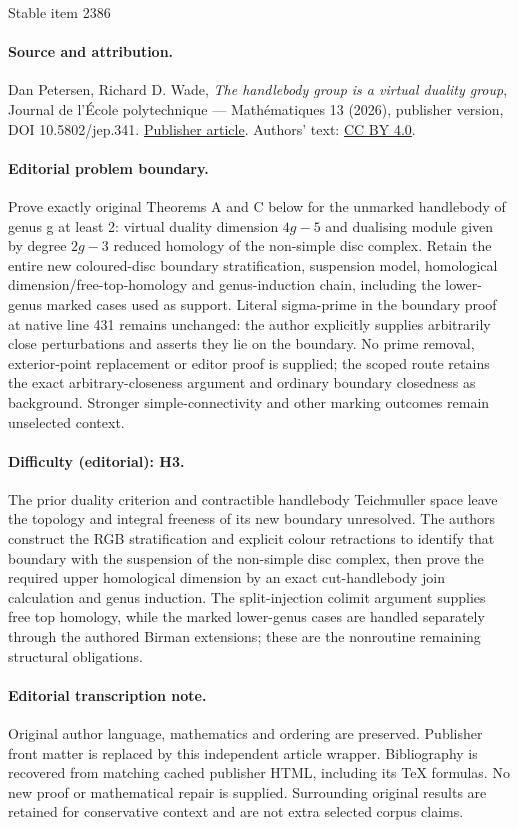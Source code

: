\documentclass[11pt]{article}
\theoremstyle{plain}
\theoremstyle{definition}
\begin{document}
\begin{center}{\Large Stable item 2386}\end{center}
\paragraph{Source and attribution.}
Dan Petersen, Richard D. Wade, \emph{The handlebody group is a virtual duality group}, Journal de l’École polytechnique — Mathématiques 13 (2026), publisher version, DOI 10.5802/jep.341. \href{https://jep.centre-mersenne.org/articles/10.5802/jep.341/}{Publisher article}. Authors' text: \href{https://creativecommons.org/licenses/by/4.0/}{CC BY 4.0}.
\paragraph{Editorial problem boundary.}
Prove exactly original Theorems A and C below for the unmarked handlebody of genus g at least 2: virtual duality dimension $4g-5$ and dualising module given by degree $2g-3$ reduced homology of the non-simple disc complex. Retain the entire new coloured-disc boundary stratification, suspension model, homological dimension/free-top-homology and genus-induction chain, including the lower-genus marked cases used as support. Literal sigma-prime in the boundary proof at native line 431 remains unchanged: the author explicitly supplies arbitrarily close perturbations and asserts they lie on the boundary. No prime removal, exterior-point replacement or editor proof is supplied; the scoped route retains the exact arbitrary-closeness argument and ordinary boundary closedness as background. Stronger simple-connectivity and other marking outcomes remain unselected context.
\paragraph{Difficulty (editorial): H3.}
The prior duality criterion and contractible handlebody Teichmuller space leave the topology and integral freeness of its new boundary unresolved. The authors construct the RGB stratification and explicit colour retractions to identify that boundary with the suspension of the non-simple disc complex, then prove the required upper homological dimension by an exact cut-handlebody join calculation and genus induction. The split-injection colimit argument supplies free top homology, while the marked lower-genus cases are handled separately through the authored Birman extensions; these are the nonroutine remaining structural obligations.
\paragraph{Editorial transcription note.}
Original author language, mathematics and ordering are preserved. Publisher front matter is replaced by this independent article wrapper. Bibliography is recovered from matching cached publisher HTML, including its TeX formulas. No new proof or mathematical repair is supplied. Surrounding original results are retained for conservative context and are not extra selected corpus claims.
\clearpage
\end{document}
